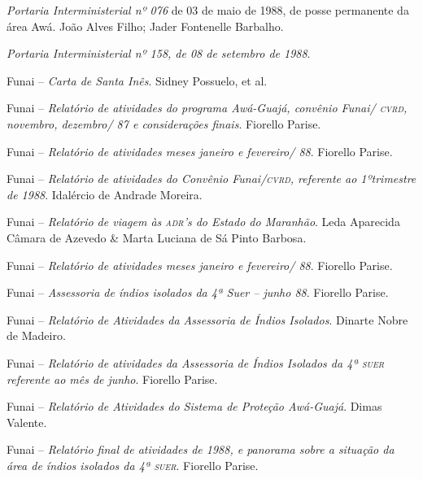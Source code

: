 \begin{itemize}
{\item[1988] \emph{Portaria Interministerial nº 076} de 03 de maio de
1988, de posse permanente da área Awá. João Alves Filho; Jader
Fontenelle Barbalho.

\item[1988] \emph{Portaria Interministerial nº 158, de 08 de setembro
de 1988}.

\item[1988] Funai -- \emph{Carta de Santa Inês}. Sidney Possuelo, et
al.

\item[1988] Funai -- \emph{Relatório de atividades do programa
Awá-Guajá, convênio Funai/ \textsc{cvrd}, novembro, dezembro/ 87 e considerações
finais}. Fiorello Parise.

\item[1988] Funai -- \emph{Relatório de atividades meses janeiro e
fevereiro/ 88}. Fiorello Parise.

\item[1988] Funai -- \emph{Relatório de atividades do Convênio
Funai/\textsc{cvrd}, referente ao 1ºtrimestre de 1988}. Idalércio de Andrade
Moreira.

\item[1988] Funai -- \emph{Relatório de viagem às \textsc{adr}'s do Estado do
Maranhão}. Leda Aparecida Câmara de Azevedo \& Marta Luciana de Sá Pinto
Barbosa.

\item[1988] Funai -- \emph{Relatório de atividades meses janeiro e
fevereiro/ 88}. Fiorello Parise.

\item[1988] Funai -- \emph{Assessoria de índios isolados da 4ª Suer
-- junho 88}. Fiorello Parise.

\item[1988] Funai -- \emph{Relatório de Atividades da Assessoria de
Índios Isolados}. Dinarte Nobre de Madeiro.

\item[1988] Funai -- \emph{Relatório de atividades da Assessoria de
Índios Isolados da 4ª \textsc{suer} referente ao mês de junho}. Fiorello Parise.

\item[1988] Funai -- \emph{Relatório de Atividades do Sistema de
Proteção Awá-Guajá}. Dimas Valente.

\item[1988] Funai -- \emph{Relatório final de atividades de 1988, e
panorama sobre a situação da área de índios isolados da 4ª \textsc{suer}}.
Fiorello Parise.

}
\end{itemize}
